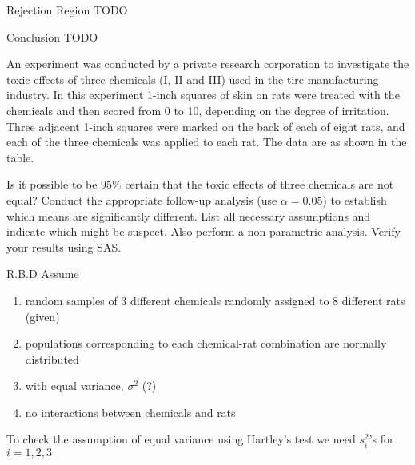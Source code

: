 \documentclass{article}
\begin{document}
Rejection Region TODO

Conclusion TODO






An experiment was conducted by a private research corporation to investigate the toxic
effects of three chemicals (I, II and III) used in the tire-manufacturing industry. In this
experiment 1-inch squares of skin on rats were treated with the chemicals and then scored
from 0 to 10, depending on the degree of irritation. Three adjacent 1-inch squares were
marked on the back of each of eight rats, and each of the three chemicals was applied to
each rat. The data are as shown in the table. 

Is it possible to be $95\%$ certain that the toxic effects of three chemicals are not equal? Conduct
the appropriate follow-up analysis (use $\alpha = 0.05$) to establish which means are significantly
different. List all necessary assumptions and indicate which might be suspect. Also perform a
non-parametric analysis. Verify your results using SAS. 


R.B.D
Assume 
\begin{enumerate}[1)]
\item random samples of 3 different chemicals randomly assigned to 8 different rats (given)
\item populations corresponding to each chemical-rat combination are normally distributed
\item with equal variance, $\sigma^2$ (?)
\item no interactions between chemicals and rats
\end{enumerate}

To check the assumption of equal variance using Hartley's test we need $s_i^2$'s for $i = 1,2,3$
\end{document}

